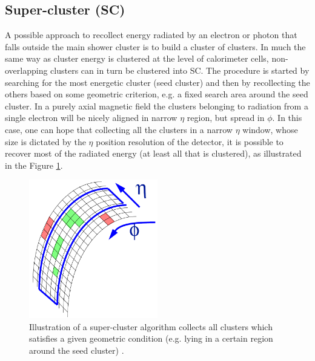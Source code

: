 \subsection*{Super-cluster (SC)}\label{subsec:super-cluster}

A possible approach to recollect energy radiated by an electron or photon that falls outside the main shower cluster is to build a cluster of clusters. In much the same way as cluster energy is clustered at the level of calorimeter cells, non-overlapping clusters can in turn be clustered into SC. The procedure is started by searching for the most energetic cluster (seed cluster) and then by recollecting the others based on some geometric criterion, e.g. a fixed search area around the seed cluster. In a purely axial magnetic field the clusters belonging to radiation from a single electron will be nicely aligned in narrow $\eta$ region, but spread in $\phi$. In this case, one can hope that collecting all the clusters in a narrow $\eta$ window, whose size is dictated by the $\eta$ position resolution of the detector, it is possible to recover most of the radiated energy (at least all that is clustered), as illustrated in the Figure \ref{fig:Super-cluster}.

\begin{figure}[h!]
\begin{center}
\includegraphics[width=0.5\textwidth]{figures/Reconstruction/Electron_photon/SuperCluster.png}
\caption{Illustration of a super-cluster algorithm collects all clusters which satisfies a given geometric condition (e.g. lying in a certain region around the seed cluster) \cite{CMS-Note-2001-034}.}
\label{fig:Super-cluster}
\end{center}
\end{figure}


